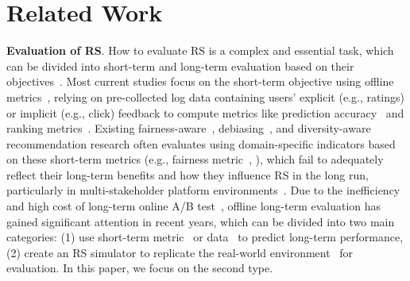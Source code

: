 \section{Related Work}
\textbf{Evaluation of RS}. How to evaluate RS is a complex and essential task, which can be divided into short-term and long-term evaluation based on their objectives~\cite{zangerle2022evaluating_RS_survey}. Most current studies focus on the short-term objective using offline metrics~\cite{jannach2020escaping, jannach2012recommender_landscape}, relying on pre-collected log data containing users' explicit (e.g., ratings) or implicit (e.g., click) feedback to compute metrics like prediction accuracy~\cite{willmott2005MAE} and ranking metrics~\cite{jarvelin2002ndcg}. 
Existing fairness-aware~\cite{ye2024bankfair, xu2024taxation, naghiaei2022cpfair}, debiasing~\cite{chen2023bias}, and diversity-aware~\cite{carbonell1998mmr} recommendation research often evaluates using domain-specific indicators based on these short-term metrics (e.g., fairness metric~\cite{gastwirth1972giniindex}, ), which fail to adequately reflect their long-term benefits and how they influence RS in the long run, particularly in multi-stakeholder platform environments~\cite{surer2018multistakeholder}.
Due to the inefficiency and high cost of long-term online A/B test~\cite{kohavi2015onlineabtest, saito2024long_term_off_policy_saito}, offline long-term evaluation has gained significant attention in recent years, which can be divided into two main categories: (1) use short-term metric~\cite{hohnhold2015focusing} or data~\cite{saito2024long_term_off_policy_saito} to predict long-term performance, (2) create an RS simulator to replicate the real-world environment~\cite{ie2019recsim, zhang2024agent4rec, wang2023recagent} for evaluation.
In this paper, we focus on the second type. 

